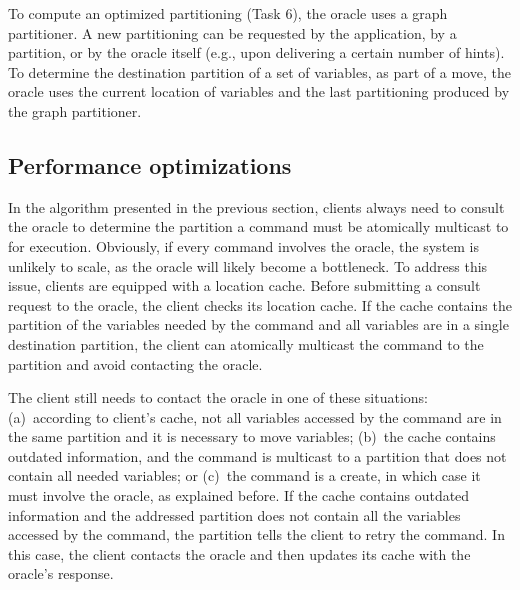 To compute an optimized partitioning (Task 6), the oracle uses a graph partitioner.
A new partitioning can be requested by the application, by a partition, or by the oracle itself (e.g., upon delivering a certain number of hints).
To determine the destination partition of a set of variables, as part of a move, the oracle uses the current location of variables and the last partitioning produced by the graph partitioner.


\subsection{Performance optimizations}
\label{sec:optm}

In the algorithm presented in the previous section, clients always need to consult the oracle to determine the partition a command must be atomically multicast to for execution.
Obviously, if every command involves the oracle, the system is unlikely to scale, as the oracle will likely become a bottleneck.
To address this issue, clients are equipped with a location cache.
Before submitting a consult request to the oracle, the client checks its location cache.
If the cache contains the partition of the variables needed by the command and all variables are in a single destination partition, the client can atomically multicast the command to the partition and avoid contacting the oracle. 

The client still needs to contact the oracle in one of these situations:
(a)~according to client's cache, not all variables accessed by the command are in the same partition and it is necessary to move variables;
(b)~the cache contains outdated information, and the command is multicast to a partition that does not contain all needed variables; or
(c)~the command is a create, in which case it must involve the oracle, as explained before.
If the cache contains outdated information and the addressed partition does not contain all the variables accessed by the command, the partition tells the client to retry the command.
In this case, the client contacts the oracle and then updates its cache with the oracle's response.






